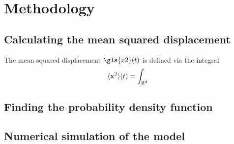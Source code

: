 \chapter{Methodology}



\section{Calculating the mean squared displacement} 

The mean squared displacement $\gls{x2}(t)$ is defined via the integral 
%
\begin{align}
\langle \mathbf{ x }^2 \rangle(t) = \int_{\mathbb{R}^d}
\end{align}

\section{Finding the probability density function}

\section{Numerical simulation of the model}